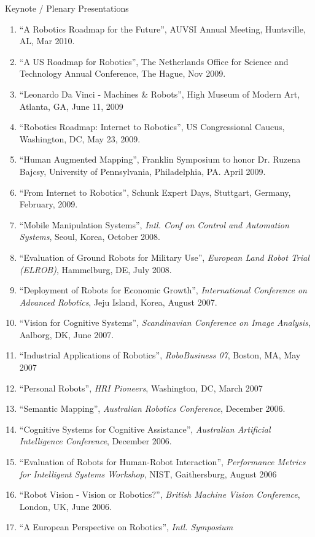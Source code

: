 \documentclass{article}
\begin{document}
\begin{cv}
\begin{cvlist}{Keynote / Plenary Presentations}
\begin{enumerate}
  \item ``A Robotics Roadmap for the Future'', AUVSI Annual Meeting, Huntsville, AL, Mar 2010.
  \item ``A US Roadmap for Robotics'', The Netherlands Office for Science and Technology Annual Conference, The Hague, Nov 2009.
  \item ``Leonardo Da Vinci - Machines \& Robots'', High Museum of Modern Art, Atlanta, GA, June 11, 2009
  \item ``Robotics Roadmap: Internet to Robotics'', US Congressional Caucus, Washington, DC, May 23, 2009.
  \item ``Human Augmented Mapping'', Franklin Symposium to honor Dr. Ruzena Bajcsy, University of Pennsylvania, Philadelphia,
    PA. April 2009.
  \item ``From Internet to Robotics'', Schunk Expert Days, Stuttgart, Germany, February, 2009.
  \item ``Mobile Manipulation Systems'', {\em Intl. Conf on Control
    and Automation Systems}, Seoul, Korea, October 2008.
  \item ``Evaluation of Ground Robots for Military Use'', {\em
    European Land Robot Trial (ELROB)}, Hammelburg, DE, July 2008.
  \item ``Deployment of Robots for Economic Growth'', {\em
    International Conference on Advanced Robotics}, Jeju Island,
    Korea, August 2007.
  \item ``Vision for Cognitive Systems'', {\em Scandinavian Conference
    on Image Analysis}, Aalborg, DK, June 2007.
  \item ``Industrial Applications of Robotics'', {\em RoboBusiness
    07}, Boston, MA, May 2007
  \item ``Personal Robots'', {\em HRI Pioneers}, Washington, DC, March
    2007
  \item ``Semantic Mapping'', {\em Australian Robotics Conference},
    December 2006.
  \item ``Cognitive Systems for Cognitive Assistance'', {\em
    Australian Artificial Intelligence Conference}, December 2006.
  \item ``Evaluation of Robots for Human-Robot Interaction'', {\em
    Performance Metrics for Intelligent Systems Workshop}, NIST,
    Gaithersburg, August 2006
  \item ``Robot Vision - Vision or Robotics?'', {\em British Machine
    Vision Conference}, London, UK, June 2006.
  \item ``A European Perspective on Robotics'', {\em Intl. Symposium
}
\end{enumerate}
\end{cvlist}
\end{cv}
\end{document}
